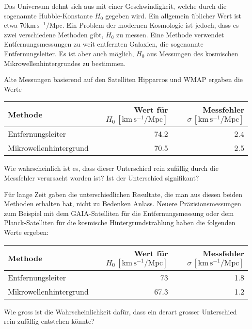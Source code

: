 Das Universum dehnt sich aus mit einer Geschwindigkeit, welche
durch die sogenannte Hubble-Konstante $H_0$ gegeben wird.
Ein allgemein üblicher Wert ist etwa $70 \text{km}\,\text{s}^{-1}/\text{Mpc}$.
Ein Problem der modernen Kosmologie ist jedoch, dass es zwei verschiedene
Methoden gibt, $H_0$ zu messen.
Eine Methode verwendet Entfernungsmessungen zu weit entfernten Galaxien,
die sogenannte Entfernungsleiter.
Es ist aber auch möglich, $H_0$ aus Messungen des kosmischen
Mikrowellenhintergrundes zu bestimmen.
\begin{teilaufgaben}
\item
Alte Messungen basierend auf den Satelliten Hipparcos und WMAP ergaben
die Werte
\begin{center}
\begin{tabular}{|l|r|r|}
\hline
Methode               &Wert für $H_0\,[\text{km}\,\text{s}^{-1}/\text{Mpc}]$&Messfehler $\sigma\,[\text{km}\,\text{s}^{-1}/\text{Mpc}]$\\
\hline
Entfernungsleiter     &74.2&2.4\\
Mikrowellenhintergrund&70.5&2.5\\
\hline
\end{tabular}
\end{center}
Wie wahrscheinlich ist es, dass dieser Unterschied rein zufällig durch
die Messfehler verursacht worden ist?
Ist der Unterschied signifikant?
\item
Für lange Zeit gaben die unterschiedlichen Resultate, die man aus diesen
beiden Methoden erhalten hat, nicht zu Bedenken Anlass.
Neuere Präzisionsmessungen zum Beispiel mit dem GAIA-Satelliten für 
die Entfernungsmessung oder dem Planck-Satelliten für die kosmische
Hintergrundstrahlung haben die folgenden Werte ergeben:
\begin{center}
\begin{tabular}{|l|r|r|}
\hline
Methode               &Wert für $H_0\,[\text{km}\,\text{s}^{-1}/\text{Mpc}]$&Messfehler $\sigma\,[\text{km}\,\text{s}^{-1}/\text{Mpc}]$\\
\hline
Entfernungsleiter     &73\phantom{.0}&1.8\\
Mikrowellenhintergrund&67.3&1.2\\
\hline
\end{tabular}
\end{center}
Wie gross ist die Wahrscheinlichkeit dafür, dass ein derart grosser
Unterschied rein zufällig entstehen könnte?
\end{teilaufgaben}


